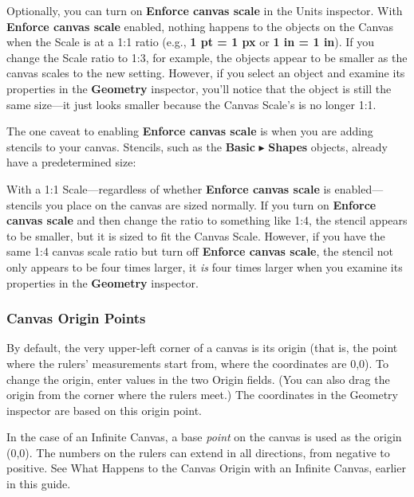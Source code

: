 \documentclass[../main.tex]{subfiles}
\begin{document}
Optionally, you can turn on \textbf{Enforce canvas scale} in the Units inspector. With
\textbf{Enforce canvas scale} enabled, nothing happens to the objects on the Canvas when the
Scale is at a 1:1 ratio (e.g., \textbf{1 pt = 1 px} or \textbf{1 in = 1 in}). If you change
the Scale ratio to 1:3, for example, the objects appear to be smaller as the canvas scales to
the new setting. However, if you select an object and examine its properties in the
\textbf{Geometry} inspector, you'll notice that the object is still the same size---it just
looks smaller because the Canvas Scale's is no longer 1:1.

The one caveat to enabling \textbf{Enforce canvas scale} is when you are adding stencils to your
canvas. Stencils, such as the \textbf{Basic} $\blacktriangleright$ \textbf{Shapes} objects,
already have a predetermined size:


With a 1:1 Scale---regardless of whether \textbf{Enforce canvas scale} is enabled---stencils you
place on the canvas are sized normally. If you turn on \textbf{Enforce canvas scale} and then
change the ratio to something like 1:4, the stencil appears to be smaller, but it is sized to
fit the Canvas Scale. However, if you have the same 1:4 canvas scale ratio but turn off
\textbf{Enforce canvas scale}, the stencil not only appears to be four times larger, it
\textit{is} four times larger when you examine its properties in the \textbf{Geometry}
inspector.

\subsubsection{Canvas Origin Points}

By default, the very upper-left corner of a canvas is its origin (that is, the point where the
rulers' measurements start from, where the coordinates are 0,0). To change the origin, enter
values in the two Origin fields. (You can also drag the origin from the corner where the
rulers meet.) The coordinates in the Geometry inspector are based on this origin point.

\begin{ognote}
  In the case of an Infinite Canvas, a base \textit{point} on the canvas is used as the origin
  (0,0). The numbers on the rulers can extend in all directions, from negative to positive. See
  What Happens to the Canvas Origin with an Infinite Canvas, earlier in this guide.
\end{ognote}
\end{document}
